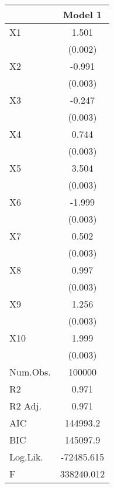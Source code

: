 \begin{table}[H]
\centering
\begin{tabular}[t]{lc}
\toprule
  & Model 1\\
\midrule
X1 & 1.501\\
 & (0.002)\\
X2 & -0.991\\
 & \vphantom{8}(0.003)\\
X3 & -0.247\\
 & \vphantom{7}(0.003)\\
X4 & 0.744\\
 & \vphantom{6}(0.003)\\
X5 & 3.504\\
 & \vphantom{5}(0.003)\\
X6 & -1.999\\
 & \vphantom{4}(0.003)\\
X7 & 0.502\\
 & \vphantom{3}(0.003)\\
X8 & 0.997\\
 & \vphantom{2}(0.003)\\
X9 & 1.256\\
 & \vphantom{1}(0.003)\\
X10 & 1.999\\
 & (0.003)\\
\midrule
Num.Obs. & 100000\\
R2 & 0.971\\
R2 Adj. & 0.971\\
AIC & 144993.2\\
BIC & 145097.9\\
Log.Lik. & -72485.615\\
F & 338240.012\\
\bottomrule
\end{tabular}
\end{table}
